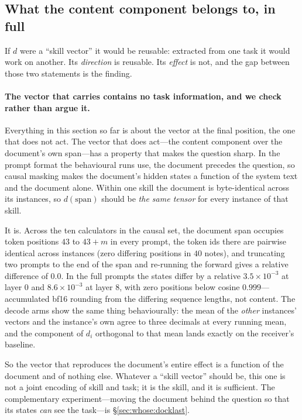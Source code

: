 \documentclass{article}
\newcommand{\dvec}{\ensuremath{d}}
\begin{document}
\subsection{What the content component belongs to, in full}
\label{app:whose}
\label{app:belongs}

If $\dvec$ were a ``skill vector'' it would be reusable: extracted from one task
it would work on another. Its \emph{direction} is reusable. Its \emph{effect}
is not, and the gap between those two statements is the finding.

\paragraph{The vector that carries contains no task information, and we check
rather than argue it.} Everything in this section so far is about the vector at
the final position, the one that does not act. The vector that does act---the
content component over the document's own span---has a property that makes the
question sharp. In the prompt format the behavioural runs use, the document
precedes the question, so causal masking makes the document's hidden states a
function of the system text and the document alone. Within one skill the
document is byte-identical across its instances, so $\dvec(\text{span})$ should
be \emph{the same tensor} for every instance of that skill.

It is. Across the ten calculators in the causal set, the document span occupies
token positions $43$ to $43+m$ in every prompt, the token ids there are
pairwise identical across instances (zero differing positions in $40$ notes),
and truncating two prompts to the end of the span and re-running the forward
gives a relative difference of $0.0$. In the full prompts the states differ by a
relative $3.5\times10^{-3}$ at layer 0 and $8.6\times10^{-3}$ at layer 8, with
zero positions below cosine $0.999$---accumulated bf16 rounding from the
differing sequence lengths, not content. The decode arms show the same thing
behaviourally: the mean of the \emph{other} instances' vectors and the
instance's own agree to three decimals at every running mean, and the component
of $\dvec_i$ orthogonal to that mean lands exactly on the receiver's baseline.

So the vector that reproduces the document's entire effect is a function of the
document and of nothing else. Whatever a ``skill vector'' should be, this one is
not a joint encoding of skill and task; it is the skill, and it is sufficient.
The complementary experiment---moving the document behind the question so that
its states \emph{can} see the task---is \S\ref{sec:whose:docklast}.
\end{document}
